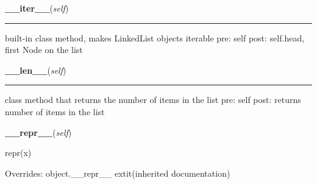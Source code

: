     \label{coinor:blimpy:LinkedList':LinkedList:__iter__}

    \vspace{0.5ex}

\hspace{.8\funcindent}\begin{boxedminipage}{\funcwidth}

    \raggedright \textbf{\_\_iter\_\_}(\textit{self})

    \vspace{-1.5ex}

    \rule{\textwidth}{0.5\fboxrule}
\setlength{\parskip}{2ex}
    built-in class method, makes LinkedList objects iterable pre: self 
    post: self.head, first Node on the list

\setlength{\parskip}{1ex}
    \end{boxedminipage}

    \label{coinor:blimpy:LinkedList':LinkedList:__len__}

    \vspace{0.5ex}

\hspace{.8\funcindent}\begin{boxedminipage}{\funcwidth}

    \raggedright \textbf{\_\_len\_\_}(\textit{self})

    \vspace{-1.5ex}

    \rule{\textwidth}{0.5\fboxrule}
\setlength{\parskip}{2ex}
    class method that returns the number of items in the list pre: self 
    post: returns number of items in the list

\setlength{\parskip}{1ex}
    \end{boxedminipage}

    \vspace{0.5ex}

\hspace{.8\funcindent}\begin{boxedminipage}{\funcwidth}

    \raggedright \textbf{\_\_repr\_\_}(\textit{self})

\setlength{\parskip}{2ex}
    repr(x)

\setlength{\parskip}{1ex}
      Overrides: object.\_\_repr\_\_ 	extit{(inherited documentation)}

    \end{boxedminipage}

